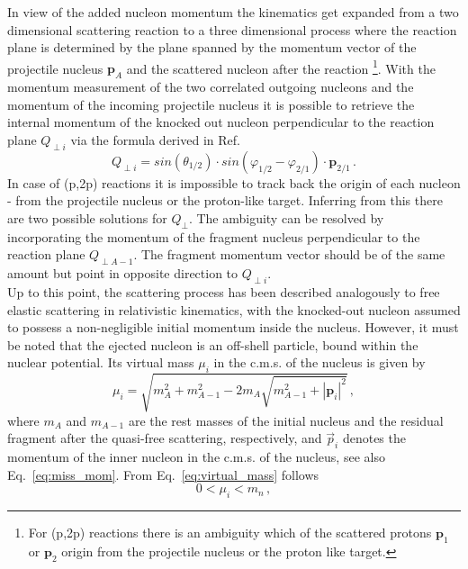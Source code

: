In view of the added nucleon momentum the kinematics get expanded from a two dimensional scattering reaction to a three dimensional process where the reaction plane is determined by the plane spanned by the momentum vector of the projectile nucleus $\mathbf{p}_A$ and the scattered nucleon after the reaction \footnote{For (p,2p) reactions there is an ambiguity which of the scattered protons $\mathbf{p}_1$ or $\mathbf{p}_2$ origin from the projectile nucleus or the proton like target.}. With the momentum measurement of the two correlated outgoing nucleons and the momentum of the incoming projectile nucleus it is possible to retrieve the internal momentum of the knocked out nucleon perpendicular to the reaction plane $Q_{\perp i}$ via the formula derived in Ref.~\cite{chulkov2005quasi}
\begin{equation}\label{eq:chulkov}
Q_{\perp i} = sin(\theta_{1/2})\cdot sin(\varphi_{1/2} -\varphi_{2/1})\cdot\mathbf{p}_{2/1} \, .
\end{equation}
In case of (p,2p) reactions it is impossible to track back the origin of each nucleon - from the projectile nucleus or the proton-like target. Inferring from this there are two possible solutions for $Q_{\perp}$. The ambiguity can be resolved by incorporating the momentum of the fragment nucleus perpendicular to the reaction plane $Q_{\perp A-1}$. The fragment momentum vector should be of the same amount but point in opposite direction to $Q_{\perp i}$.\\
Up to this point, the scattering process has been described analogously to free elastic scattering in relativistic kinematics, with the knocked-out nucleon assumed to possess a non-negligible initial momentum inside the nucleus. However, it must be noted that the ejected nucleon is an off-shell particle, bound within the nuclear potential. Its virtual mass \( \mu_i \) in the c.m.s. of the nucleus is given by
\begin{equation}
\mu_i =  \sqrt{m_A^2 + m_{A-1}^2 - 2m_A\sqrt{m_{A-1}^2 + |\mathbf{p}_i|^2}} \, ,
\label{eq:virtual_mass}
\end{equation}
where \( m_A \) and \( m_{A-1} \) are the rest masses of the initial nucleus and the residual fragment after the quasi-free scattering, respectively, and \( \vec{p}_{i} \) denotes the momentum of the inner nucleon  in the c.m.s. of the nucleus, see also Eq.~\ref{eq:miss_mom}. From Eq.~\ref{eq:virtual_mass} follows
\begin{equation}
0 < \mu_i  < m_n \, ,
\end{equation}
